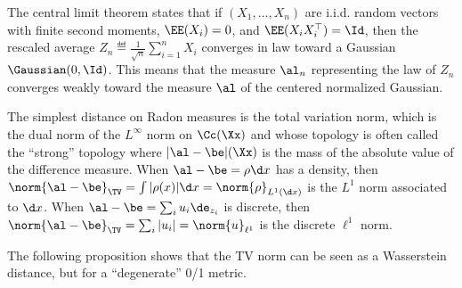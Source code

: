 \begin{rem}\label{rem-clt}
		The central limit theorem states that if $(X_1,\ldots,X_n)$ are i.i.d. random vectors with finite second moments, $\EE(X_i)=0$, and $\EE(X_i X_i^\top)=\Id$, then the rescaled average $Z_n \eqdef \frac{1}{\sqrt{n}} \sum_{i=1}^n X_i$ converges in law toward a Gaussian $\Gaussian(0,\Id)$. This means that the measure $\al_n$ representing the law of $Z_n$ converges weakly toward the measure $\al$ of the centered normalized Gaussian.
\end{rem}

\begin{defn}
The simplest distance on Radon measures is the total variation norm, which is the dual norm of the $L^\infty$ norm on $\Cc(\Xx)$ and whose topology is often called the ``strong'' topology
where $|\al-\be|(\Xx)$ is the mass of the absolute value of the difference measure. When $\al-\be=\rho \d x$ has a density, then $\norm{\al-\be}_{\TV}=\int |\rho(x)| \d x=\norm{\rho}_{L^1(\d x)}$ is the $L^1$ norm associated to $\d x$. When $\al-\be=\sum_i u_i \de_{z_i}$ is discrete, then $\norm{\al-\be}_{\TV}=\sum_i |u_i|=\norm{u}_{\ell^1}$ is the discrete $\ell^1$ norm.
\end{defn}

The following proposition shows that the TV norm can be seen as a Wasserstein distance, but for a ``degenerate'' 0/1 metric.

